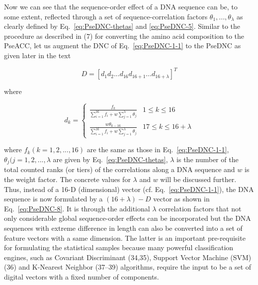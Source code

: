 Now we can see that the sequence-order effect of a DNA sequence can be, to some extent, reflected through a set of sequence-correlation factors $\theta_{1},...,\theta_{\lambda}$ as clearly defined by Eq.~\ref{eq:PseDNC-thetas} and \ref{eq:PseDNC-5}. Similar to the procedure as described in (7) for converting the amino acid composition to the PseACC, let us augment the DNC of Eq.~\ref{eq:PseDNC-1-1} to the \gls{PseDNC} as given later in the text

\begin{equation}\label{eq:PseDNC-8}
    D = [d_{1} d_{2} ... d_{16} d_{16+1} ... d_{16+\lambda}]^{T}
\end{equation}

where

\begin{equation}\label{eq:PseDNC-9}
    d_{k} = \begin{cases}\frac{f_{k}}{\sum_{i=1}^{16} f_{i} + w\sum_{j=1}^{\lambda}\theta_{j}} & 1 \le k \le 16\\\frac{w\theta_{k-16}}{\sum_{i=1}^{16} f_{i} + w\sum_{j=1}^{\lambda}\theta_{j}} & 17 \le k \le 16 + \lambda\end{cases}
\end{equation}

where $f_{k} (k = 1,2,...,16)$ are the same as those in Eq.~\ref{eq:PseDNC-1-1}, $\theta_{j} (j = 1,2,...,\lambda$ are given by Eq.~\ref{eq:PseDNC-thetas}, $\lambda$ is the number of the total counted ranks (or tiers) of the correlations along a DNA sequence and $w$ is the weight factor. The concrete values for $\lambda$ and $w$ will be discussed further. Thus, instead of a 16-D (dimensional) vector (cf. Eq.~\ref{eq:PseDNC-1-1}), the DNA sequence is now formulated by a $(16 + \lambda) - D$ vector as shown in Eq.~\ref{eq:PseDNC-8}. It is through the additional $\lambda$ correlation factors that not only considerable global sequence-order effects can be incorporated but the DNA sequences with extreme difference in length can also be converted into a set of feature vectors with a same dimension. The latter is an important pre-requisite for formulating the statistical samples because many powerful classification engines, such as Covariant Discriminant (34,35), Support Vector Machine (SVM) (36) and K-Nearest Neighbor (37–39) algorithms, require the input to be a set of digital vectors with a fixed number of components.



